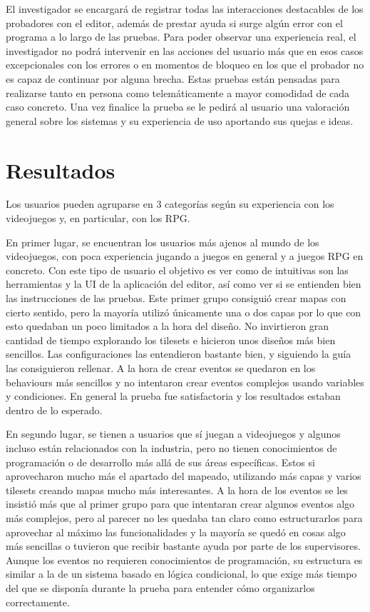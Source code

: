 \medskip

El investigador se encargará de registrar todas las interacciones destacables de los probadores con el editor, además de prestar ayuda si surge algún error con el programa a lo largo de las pruebas. Para poder observar una experiencia real, el investigador no podrá intervenir en las acciones del usuario más que en esos casos excepcionales con los errores o en momentos de bloqueo en los que el probador no es capaz de continuar por alguna brecha. Estas pruebas están pensadas para realizarse tanto en persona como telemáticamente a mayor comodidad de cada caso concreto. Una vez finalice la prueba se le pedirá al usuario una valoración general sobre los sistemas y su experiencia de uso aportando sus quejas e ideas.

\section{Resultados}

Los usuarios pueden agruparse en 3 categorías según su experiencia con los videojuegos y, en particular, con los RPG.

\smallskip 

En primer lugar, se encuentran los usuarios más ajenos al mundo de los videojuegos, con poca experiencia jugando a juegos en general y a juegos RPG en concreto. Con este tipo de usuario el objetivo es ver como de intuitivas son las herramientas y la UI de la aplicación del editor, así como ver si se entienden bien las instrucciones de las pruebas. Este primer grupo consiguió crear mapas con cierto sentido, pero la mayoría utilizó únicamente una o dos capas por lo que con esto quedaban un poco limitados a la hora del diseño. No invirtieron gran cantidad de tiempo explorando los tilesets e hicieron unos diseños más bien sencillos. Las configuraciones las entendieron bastante bien, y siguiendo la guía las consiguieron rellenar. A la hora de crear eventos se quedaron en los behaviours más sencillos y no intentaron crear eventos complejos usando variables y condiciones. En general la prueba fue satisfactoria y los resultados estaban dentro de lo esperado. 

\medskip

En segundo lugar, se tienen a usuarios que sí juegan a videojuegos y algunos incluso están relacionados con la industria, pero no tienen conocimientos de programación o de desarrollo más allá de sus áreas específicas. Estos si aprovecharon mucho más el apartado del mapeado, utilizando más capas y varios tilesets creando mapas mucho más interesantes. A la hora de los eventos se les insistió más que al primer grupo para que intentaran crear algunos eventos algo más complejos, pero al parecer no les quedaba tan claro como estructurarlos para aprovechar al máximo las funcionalidades y la mayoría se quedó en cosas algo más sencillas o tuvieron que recibir bastante ayuda por parte de los supervisores. Aunque los eventos no requieren conocimientos de programación, su estructura es similar a la de un sistema basado en lógica condicional, lo que exige más tiempo del que se disponía durante la prueba para entender cómo organizarlos correctamente. 

